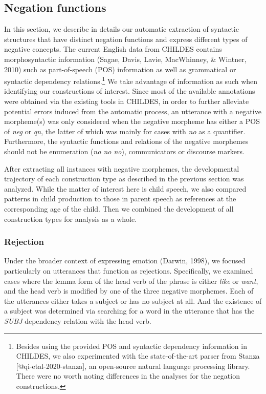 \documentclass[10pt, letterpaper]{article}
\begin{document}
\hypertarget{negation-functions}{%
\subsection{Negation functions}\label{negation-functions}}

In this section, we describe in details our automatic extraction of
syntactic structures that have distinct negation functions and express
different types of negative concepts. The current English data from
CHILDES contains morphosyntactic information (Sagae, Davis, Lavie,
MacWhinney, \& Wintner, 2010) such as part-of-speech (POS) information
as well as grammatical or syntactic dependency
relations.\footnote{Besides using the provided POS and syntactic dependency information in CHILDES, we also experimented with the state-of-the-art parser from Stanza [@qi-etal-2020-stanza], an open-source natural language processing library. There were no worth noting differences in the analyses for the negation constructions.}
We take advantage of information as such when identifying our
constructions of interest. Since most of the available annotations were
obtained via the existing tools in CHILDES, in order to further
alleviate potential errors induced from the automatic process, an
utterance with a negative morpheme(s) was only considered when the
negative morpheme has either a POS of \emph{neg} or \emph{qn}, the
latter of which was mainly for cases with \emph{no} as a quantifier.
Furthermore, the syntactic functions and relations of the negative
morphemes should not be enumeration (\emph{no no no}), communicators or
discourse markers.

After extracting all instances with negative morphemes, the
developmental trajectory of each construction type as described in the
previous section was analyzed. While the matter of interest here is
child speech, we also compared patterns in child production to those in
parent speech as references at the corresponding age of the child. Then
we combined the development of all construction types for analysis as a
whole.

\hypertarget{rejection}{%
\subsubsection{Rejection}\label{rejection}}

Under the broader context of expressing emotion (Darwin, 1998), we
focused particularly on utterances that function as rejections.
Specifically, we examined cases where the lemma form of the head verb of
the phrase is either \emph{like} or \emph{want}, and the head verb is
modified by one of the three negative morphemes. Each of the utterances
either takes a subject or has no subject at all. And the existence of a
subject was determined via searching for a word in the utterance that
has the \emph{SUBJ} dependency relation with the head verb.
\end{document}
